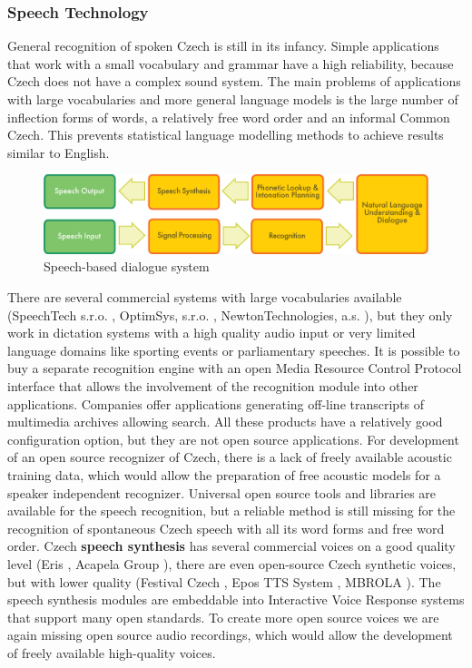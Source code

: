 \begin{multicols}{2}
\subsubsection{Speech Technology}

General recognition of spoken Czech is still in its infancy. Simple applications that work with a small vocabulary and grammar have a high reliability, because Czech does not have a complex sound system. The main problems of applications with large vocabularies and more general language models is the large number of inflection forms of words, a relatively free word order and an informal Common Czech. This prevents statistical language modelling methods to achieve results similar to English.
 \begin{figure}[htb]
  \center
  \includegraphics[width=\textwidth]{../_media/english/simple_speech-based_dialogue_architecture}
  \caption{Speech-based dialogue system}
  \label{fig:dialoguearch_en}
\end{figure}
There are several commercial systems with large vocabularies available (SpeechTech s.r.o. \cite{Note11}, OptimSys, s.r.o. \cite{Note12}, NewtonTechnologies, a.s. \cite{Note13}), but they only work in dictation systems with a high quality audio input or very limited language domains like sporting events or parliamentary speeches. It is possible to buy a separate recognition engine with an open Media Resource Control Protocol  interface that allows the involvement of the recognition module into other applications. Companies offer applications generating off-line transcripts of multimedia archives allowing search. All these products have a relatively good configuration option, but they are not open source applications. For development of an open source recognizer of Czech, there is a lack of freely available acoustic training data, which would allow the preparation of free acoustic models for a speaker independent recognizer. Universal open source tools and libraries are available for the speech recognition, but a reliable method is still missing for the recognition of spontaneous Czech speech with all its word forms and free word order.
Czech \textbf{speech synthesis} has several commercial voices on a good quality level (Eris \cite{Note11}, Acapela Group \cite{Note14}), there are even open-source Czech synthetic voices, but with lower quality (Festival Czech \cite{Note15}, Epos TTS System \cite{Note16}, MBROLA \cite{Note17}). The speech synthesis modules are embeddable into Interactive Voice Response systems that support many open standards. To create more open source voices we are again missing open source audio recordings, which would allow the development of freely available high-quality voices.\\

\end{multicols}
